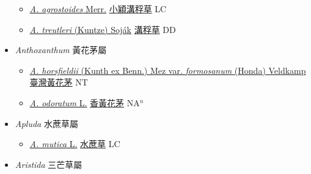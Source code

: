 \begin{itemize}
  \begin{itemize}
        \item[] \href{http://www.theplantlist.org/tpl1.1/search?q=Aniselytron+agrostoides}{\textit{A. agrostoides} Merr.}   \href{\detokenize{http://taibnet.sinica.edu.tw/chi/taibnet_species_list.php?T2=小穎溝稃草&T2_new_value=true&fr=y}}{小穎溝稃草} LC
        \item[] \href{http://www.theplantlist.org/tpl1.1/search?q=Aniselytron+treutleri}{\textit{A. treutleri} (Kuntze) Soják}   \href{\detokenize{http://taibnet.sinica.edu.tw/chi/taibnet_species_list.php?T2=溝稃草&T2_new_value=true&fr=y}}{溝稃草} DD
  \end{itemize}
 \item[] \textit{Anthoxanthum} 黃花茅屬
                    
  \begin{itemize}
        \item[] \href{http://www.theplantlist.org/tpl1.1/search?q=Anthoxanthum+horsfieldii+var.+formosanum}{\textit{A. horsfieldii} (Kunth ex Benn.) Mez var. \textit{formosanum} (Honda) Veldkamp}   \href{\detokenize{http://taibnet.sinica.edu.tw/chi/taibnet_species_list.php?T2=臺灣黃花茅&T2_new_value=true&fr=y}}{臺灣黃花茅} NT
        \item[] \href{http://www.theplantlist.org/tpl1.1/search?q=Anthoxanthum+odoratum}{\textit{A. odoratum} L.}   \href{\detokenize{http://taibnet.sinica.edu.tw/chi/taibnet_species_list.php?T2=香黃花茅&T2_new_value=true&fr=y}}{香黃花茅} NA$^n$
  \end{itemize}
 \item[] \textit{Apluda} 水蔗草屬
                    
  \begin{itemize}
        \item[] \href{http://www.theplantlist.org/tpl1.1/search?q=Apluda+mutica}{\textit{A. mutica} L.}   \href{\detokenize{http://taibnet.sinica.edu.tw/chi/taibnet_species_list.php?T2=水蔗草&T2_new_value=true&fr=y}}{水蔗草} LC
  \end{itemize}
 \item[] \textit{Aristida} 三芒草屬
                    

\end{itemize}

